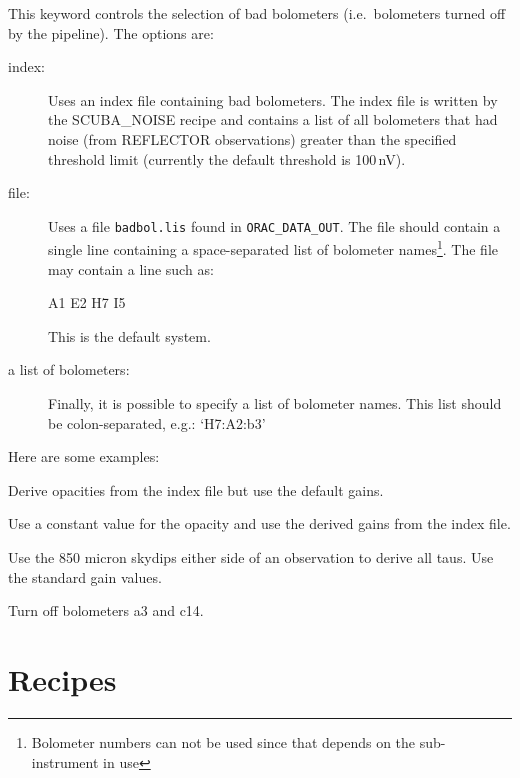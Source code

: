 \documentclass[twoside,11pt,nolof]{starlink}
\providecommand{\recipe}[1]{{\small\textsf{#1}}}
\begin{document}
\begin{itemize}
This keyword controls the selection of bad bolometers (i.e.\ bolometers
turned off by the pipeline). The options are:

\begin{description}
\item[index:] Uses an index file containing bad bolometers. The index
file is written by the \recipe{SCUBA\_NOISE} recipe and contains a list
of all bolometers that had noise (from REFLECTOR observations) greater than
the specified threshold limit (currently the default threshold is 100\,nV).
\item[file:] Uses a file \verb|badbol.lis| found
in \texttt{ORAC\_DATA\_OUT}.
The file should contain a single line containing a space-separated list
of bolometer names\footnote{Bolometer numbers can not be used since that
depends on the sub-instrument in use}. The file may contain a line such as:
\begin{terminalv}
A1 E2 H7 I5
\end{terminalv}
This is the default system.
\item[a list of bolometers:] Finally, it is possible to specify a list of
bolometer names. This list should be colon-separated, e.g.: `H7:A2:b3'

\end{description}

\end{itemize}

Here are some examples:

\begin{terminalv}
\end{terminalv}
Derive opacities from the index file but use the default gains.
\begin{terminalv}
\end{terminalv}
Use a constant value for the opacity and use the derived gains
from the index file.
\begin{terminalv}
\end{terminalv}
Use the 850 micron skydips either side of an observation
to derive all taus. Use the standard gain values.
\begin{terminalv}
\end{terminalv}
Turn off bolometers a3 and c14.


\section{Recipes}
\end{document}
